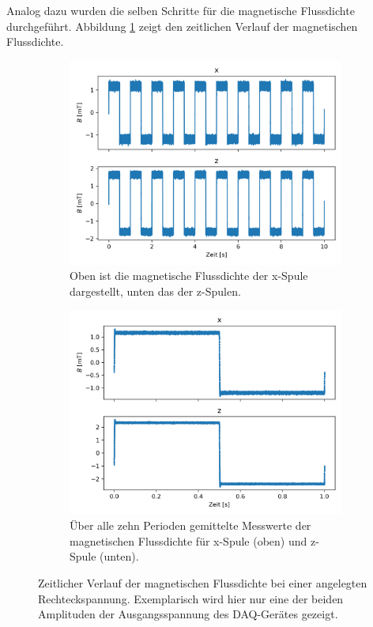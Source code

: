 \documentclass[page,pdftex,12pt,a4paper,twoside,openright]{scrbook}
\begin{document}
Analog dazu wurden die selben Schritte für die magnetische Flussdichte durchgeführt. Abbildung \ref{fig-mag} zeigt den zeitlichen Verlauf der magnetischen Flussdichte.\\

\begin{figure}
\centering
\begin{subfigure}[t]{.5\textwidth}
\includegraphics[width=\textwidth]{./img/mag.png}
\caption{Oben ist die magnetische Flussdichte der x-Spule dargestellt, unten das der z-Spulen.}
\label{fig-mag}
\end{subfigure}%
\begin{subfigure}[t]{.5\textwidth}
\includegraphics[width=\textwidth]{./img/mag_avg.png}
\caption{Über alle zehn Perioden gemittelte Messwerte der magnetischen Flussdichte für x-Spule (oben) und z-Spule (unten).}
\label{fig-mag_avg}
\end{subfigure}
\caption{Zeitlicher Verlauf der magnetischen Flussdichte bei einer angelegten Rechteckspannung. Exemplarisch wird hier nur eine der beiden Amplituden der Ausgangsspannung des DAQ-Gerätes gezeigt.}
\end{figure}
\end{document}
